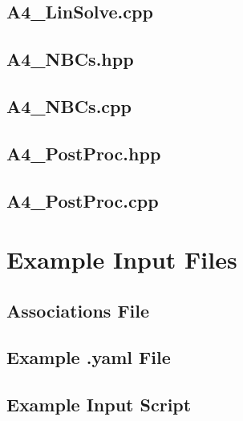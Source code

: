 \documentclass[a4paper, 12pt]{article}
\begin{document}
\subsection{A4\_LinSolve.cpp} \label{subsec:LinSolve.cpp}


\subsection{A4\_NBCs.hpp} \label{subsec:NBCs.hpp}


\subsection{A4\_NBCs.cpp} \label{subsec:NBCs.cpp}


\subsection{A4\_PostProc.hpp} \label{subsec:PostProc.hpp}


\subsection{A4\_PostProc.cpp} \label{subsec:PostProc.cpp}


\newpage
\section{Example Input Files}\label{sec:ExInput}

\subsection{Associations File} \label{subsec:ExAssoc}


\subsection{Example .yaml File} \label{subsec:ExYaml}


\subsection{Example Input Script} \label{subsec:ExIn}

\end{document}
